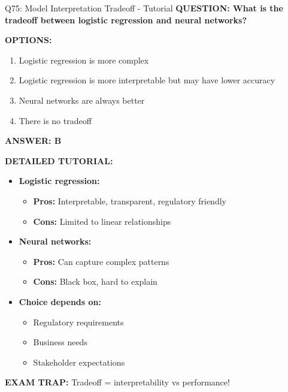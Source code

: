 \documentclass[8pt]{beamer}
\begin{document}
	\begin{frame}{Q75: Model Interpretation Tradeoff - Tutorial}
		\fontsize{6.5}{7.5}\selectfont
		\textbf{QUESTION: What is the tradeoff between logistic regression and neural networks?}
		
		\vspace{0.1cm}
		\textbf{OPTIONS:}
		\begin{enumerate}
			\item Logistic regression is more complex
			\item Logistic regression is more interpretable but may have lower accuracy
			\item Neural networks are always better
			\item There is no tradeoff
		\end{enumerate}
		
		\vspace{0.1cm}
		\textcolor{myblue}{\textbf{ANSWER: B}}
		
		\vspace{0.1cm}
		\textbf{DETAILED TUTORIAL:}
		\begin{itemize}
			\item \textbf{Logistic regression:}
			\begin{itemize}
				\item \textbf{Pros:} Interpretable, transparent, regulatory friendly
				\item \textbf{Cons:} Limited to linear relationships
			\end{itemize}
			\item \textbf{Neural networks:}
			\begin{itemize}
				\item \textbf{Pros:} Can capture complex patterns
				\item \textbf{Cons:} Black box, hard to explain
			\end{itemize}
			\item \textbf{Choice depends on:}
			\begin{itemize}
				\item Regulatory requirements
				\item Business needs
				\item Stakeholder expectations
			\end{itemize}
		\end{itemize}
		
		\textcolor{myred}{\textbf{EXAM TRAP:}} Tradeoff = \textcolor{myblue}{interpretability vs performance}!
	\end{frame}
	
\end{document}
